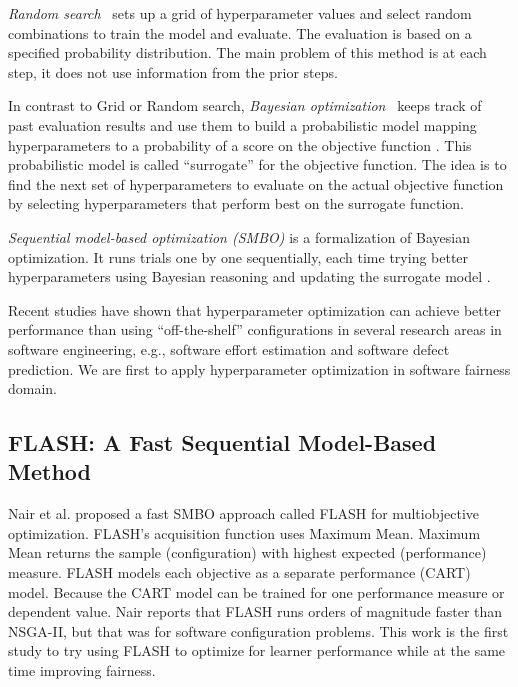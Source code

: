 \documentclass[10pt,conference]{IEEEtran}
\begin{document}
\textit{Random search}~\cite{bergstra2012random} sets up a grid of hyperparameter values and select random combinations to train the model and evaluate. The evaluation is based on a specified probability distribution. The main problem of this method is at each step, it does not use information from the prior steps. 

In contrast to Grid or Random search, \textit{Bayesian optimization}~\cite{pelikan1999boa} keeps track of past evaluation results and use them to build a probabilistic model mapping hyperparameters to a probability of a score on the objective function \cite{Will_Koehrsen}. This probabilistic model is called ``surrogate'' for the objective function. The idea is to find the next set of hyperparameters to evaluate on the actual objective function by selecting hyperparameters that perform best on the surrogate function.

\textit{Sequential model-based optimization (SMBO)} \cite{10.1007/978-3-642-25566-3_40} is a formalization of Bayesian optimization. It runs trials one by one sequentially, each time trying better hyperparameters using Bayesian reasoning and updating the surrogate model \cite{Will_Koehrsen}.

Recent studies have shown that hyperparameter optimization can achieve better performance than using ``off-the-shelf'' configurations in several research areas in software engineering, e.g., software effort estimation\cite{xia2018hyperparameter} and software defect prediction\cite{osman2017hyperparameter}. We are first to apply hyperparameter optimization in software fairness domain.

\subsection{FLASH: A Fast Sequential Model-Based Method}
Nair et al. \cite{8469102} proposed a fast SMBO approach called FLASH for multiobjective optimization. FLASH's acquisition function uses Maximum Mean. Maximum Mean returns the sample (configuration) with highest expected (performance) measure. FLASH models each objective as a separate performance (CART) model. Because the CART model can be trained for one performance measure or dependent value. Nair reports that FLASH runs orders of magnitude faster than NSGA-II, but that was for software configuration problems. This work is the first study to try using  FLASH to optimize for learner performance while at the same time improving fairness.
\end{document}
